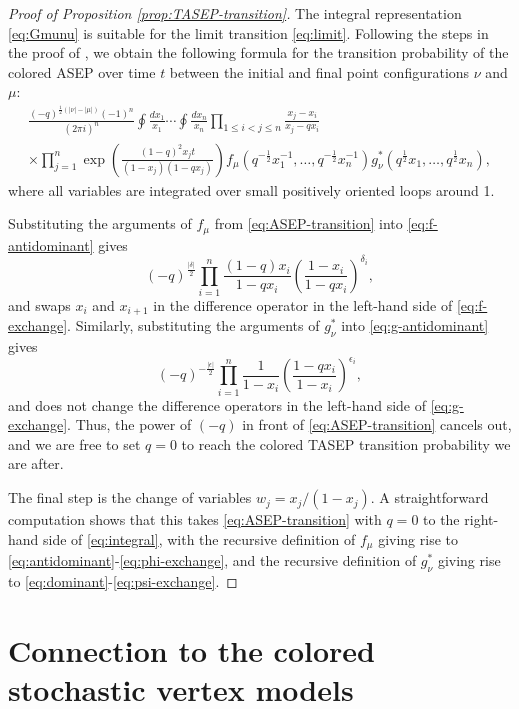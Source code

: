 \documentclass[11pt,reqno]{amsart}
\theoremstyle{definition}
\theoremstyle{remark}
\theoremstyle{remark}
\def\leq{\leqslant}
\numberwithin{equation}{section}
\begin{document}
\begin{proof}[Proof of Proposition \ref{prop:TASEP-transition}]
		The integral representation \eqref{eq:Gmunu} is suitable for the limit transition \eqref{eq:limit}. Following the steps in 
		the proof of \cite[Theorem 3.5]{deGier-Mead-Wheeler}, we obtain the following formula for the transition probability of the colored ASEP over time $t$ between the initial and final point configurations $\nu$ and $\mu$:
		\begin{equation}
			\label{eq:ASEP-transition}
			\begin{gathered}
				\frac{(-q)^{\frac 12(|\nu|-|\mu|)}(-1)^n}{(2\pi i)^n}
				\oint
				\frac{dx_1}{x_1}
				\cdots 
				\oint
				\frac{dx_n}{x_n}
				\prod_{1 \leq i<j \leq n}
				\frac{x_j-x_i}{x_j-q x_i}\\ \times
				\prod_{j=1}^n
				\exp\left(\frac{(1-q)^2x_jt}{(1-x_j)(1-qx_j)}\right)
				f_{\mu}\left(q^{-\frac 12}{x}_1^{-1},\dots,q^{-\frac 12}{x}_n^{-1}\right)
				g^{*}_{\nu}\left(q^{\frac 12}x_1,\dots,q^{\frac 12}x_n\right),
			\end{gathered}
		\end{equation}
		where all variables are integrated over small positively oriented loops around 1. 
		
		Substituting the arguments of $f_\mu$ from \eqref{eq:ASEP-transition} into \eqref{eq:f-antidominant} gives 
		$$
		(-q)^{\frac{|\delta|}2}\prod_{i=1}^n \frac {(1-q)x_i}{1-q x_i}\left(\frac{1-x_i}{1-qx_i}\right)^{\delta_i},
		$$
		and swaps $x_i$ and $x_{i+1}$ in the difference operator in the left-hand side of \eqref{eq:f-exchange}. Similarly, substituting the arguments of $g_\nu^*$ into \eqref{eq:g-antidominant} gives  
		$$
		(-q)^{-\frac{|\epsilon|}2}\prod_{i=1}^n \frac 1{1-x_i}\left(\frac{1-qx_i}{1-x_i}\right)^{\epsilon_i},
		$$
		and does not change the difference operators in the left-hand side of \eqref{eq:g-exchange}. Thus, the power of $(-q)$ in front of \eqref{eq:ASEP-transition} cancels out, and we are free to set $q=0$ to reach the colored TASEP transition probability we are after. 
		
		The final step is the change of variables $w_j=x_j/(1-x_j)$. A straightforward computation shows that this takes \eqref{eq:ASEP-transition} with $q=0$ to the right-hand side of \eqref{eq:integral}, with the recursive definition of $f_\mu$ giving rise to \eqref{eq:antidominant}-\eqref{eq:phi-exchange}, and the recursive definition of $g_\nu^*$ giving rise to \eqref{eq:dominant}-\eqref{eq:psi-exchange}. 
	\end{proof}
	
	
	\section{Connection to the colored stochastic vertex models}\label{sec:observables} 
	
\end{document}
